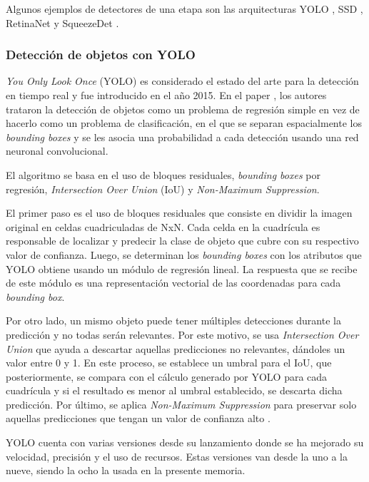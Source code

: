 Algunos ejemplos de detectores de una etapa son las arquitecturas YOLO \cite{ARTICLE:13}, SSD \cite{ARTICLE:14}, RetinaNet \cite{ARTICLE:15} y SqueezeDet \cite{ARTICLE:16}. 

\subsubsection{Detección de objetos con YOLO}

\textit{You Only Look Once} (YOLO) es considerado el estado del arte para la detección en tiempo real y fue introducido en el año 2015. En el paper \cite{ARTICLE:13}, los autores trataron la detección de objetos como un problema de regresión simple en vez de hacerlo como un problema de clasificación, en el que se separan espacialmente los \textit{bounding boxes} y se les asocia una probabilidad a cada detección usando una red neuronal convolucional.

El algoritmo se basa en el uso de bloques residuales, \textit{bounding boxes} por regresión, \textit{Intersection Over Union} (IoU) y \textit{Non-Maximum Suppression}.

El primer paso es el uso de bloques residuales que consiste en dividir la imagen original en celdas cuadriculadas de NxN. Cada celda en la cuadrícula es responsable de localizar y predecir la clase de objeto que cubre con su respectivo valor de confianza. Luego, se determinan los \textit{bounding boxes} con los atributos que YOLO obtiene usando un módulo de regresión lineal. La respuesta que se recibe de este módulo es una representación vectorial de las coordenadas para cada \textit{bounding box}.

Por otro lado, un mismo objeto puede tener múltiples detecciones durante la predicción y no todas serán relevantes. Por este motivo, se usa \textit{Intersection Over Union} que ayuda a descartar aquellas predicciones no relevantes, dándoles un valor entre 0 y 1. En este proceso, se establece un umbral para el IoU, que posteriormente, se compara con el cálculo generado por YOLO para cada cuadrícula y si el resultado es menor al umbral establecido, se descarta dicha predicción. Por último, se aplica \textit{Non-Maximum Suppression} para preservar solo aquellas predicciones que tengan un valor de confianza alto \cite{WEBSITE:7}.

YOLO cuenta con varias versiones desde su lanzamiento donde se ha mejorado su velocidad, precisión y el uso de recursos. Estas versiones van desde la uno a la nueve, siendo la ocho la usada en la presente memoria.

